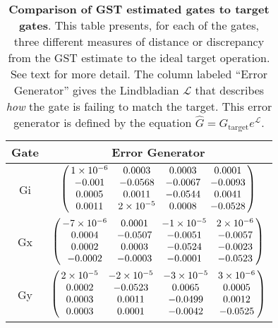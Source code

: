 {\begin{table}[h]
\begin{center}
\vspace{2em}
\begin{tabular}[l]{|c|c|}
\hline
Gate & Error Generator \\ \hline
Gi & $ \left(\!\!\begin{array}{cccc}
1\times 10^{-6} & 0.0003 & 0.0003 & 0.0001 \\ 
-0.001 & -0.0568 & -0.0067 & -0.0093 \\ 
0.0005 & 0.0011 & -0.0544 & 0.0041 \\ 
0.0011 & 2\times 10^{-5} & 0.0008 & -0.0528
 \end{array}\!\!\right) $
 \\ \hline
Gx & $ \left(\!\!\begin{array}{cccc}
-7\times 10^{-6} & 0.0001 & -1\times 10^{-5} & 2\times 10^{-6} \\ 
0.0004 & -0.0507 & -0.0051 & -0.0057 \\ 
0.0002 & 0.0003 & -0.0524 & -0.0023 \\ 
-0.0002 & -0.0003 & -0.0001 & -0.0523
 \end{array}\!\!\right) $
 \\ \hline
Gy & $ \left(\!\!\begin{array}{cccc}
2\times 10^{-5} & -2\times 10^{-5} & -3\times 10^{-5} & 3\times 10^{-6} \\ 
0.0002 & -0.0523 & 0.0065 & 0.0005 \\ 
0.0003 & 0.0011 & -0.0499 & 0.0012 \\ 
0.0003 & 0.0001 & -0.0042 & -0.0525
 \end{array}\!\!\right) $
 \\ \hline
\end{tabular}

\caption{\textbf{Comparison of GST estimated gates to target gates}.  This table presents, for each of the gates, three different measures of distance or discrepancy from the GST estimate to the ideal target operation.  See text for more detail.  The column labeled ``Error Generator'' gives the Lindbladian $\mathcal{L}$ that describes \emph{how} the gate is failing to match the target.  This error generator is defined by the equation $\hat{G} = G_{\mathrm{target}}e^{\mathcal{L}}$. \label{bestCPTPGatesetVsTargetTable}}
\end{center}
\end{table}

}
